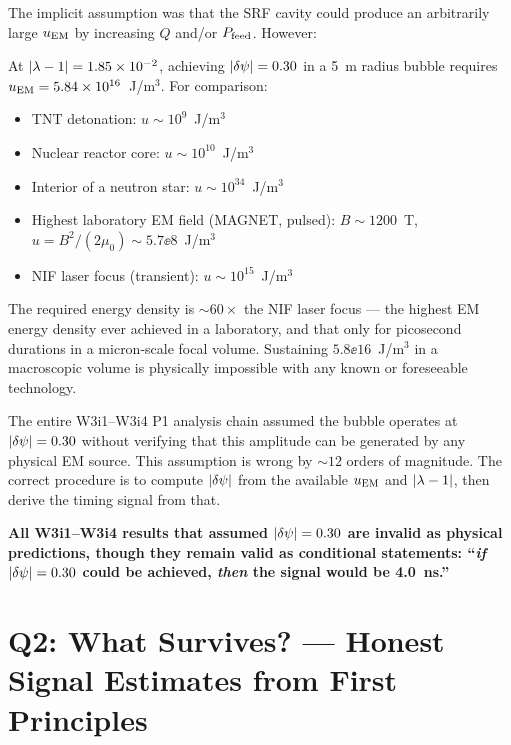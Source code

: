 The implicit assumption was that the SRF cavity could produce an arbitrarily
large $u_{\rm EM}$ by increasing $Q$ and/or $P_{\rm feed}$. However:

\begin{finding}[The $|\dpsi| = 0.30$ Operating Point Requires Nuclear-Scale
Energy Densities]
\label{find:nuclear}
At $|\lambda - 1| = 1.85\times 10^{-2}$, achieving $|\dpsi| = 0.30$ in a 5~m radius
bubble requires $u_{\rm EM} = 5.84\times 10^{16}$~J/m$^3$. For comparison:
\begin{itemize}[nosep]
\item TNT detonation: $u \sim 10^{9}$~J/m$^3$
\item Nuclear reactor core: $u \sim 10^{10}$~J/m$^3$
\item Interior of a neutron star: $u \sim 10^{34}$~J/m$^3$
\item Highest laboratory EM field (MAGNET, pulsed): $B \sim 1200$~T,
  $u = B^2/(2\mu_0) \sim 5.7\ee{8}$~J/m$^3$
\item NIF laser focus (transient): $u \sim 10^{15}$~J/m$^3$
\end{itemize}

The required energy density is $\sim 60\times$ the NIF laser focus ---
the highest EM energy density ever achieved in a laboratory, and that
only for picosecond durations in a micron-scale focal volume. Sustaining
$5.8\ee{16}$~J/m$^3$ in a macroscopic volume is physically impossible with
any known or foreseeable technology.
\end{finding}

\begin{correction}
\label{corr:unphysical_operating_point}
The entire W3i1--W3i4 P1 analysis chain assumed the bubble operates at
$|\dpsi| = 0.30$ without verifying that this amplitude can be generated by
any physical EM source. This assumption is wrong by $\sim 12$ orders of
magnitude. The correct procedure is to compute $|\delta\psi|$ from the available
$u_{\rm EM}$ and $|\lambda - 1|$, then derive the timing signal from that.

\textbf{All W3i1--W3i4 results that assumed $|\dpsi| = 0.30$ are invalid
as physical predictions, though they remain valid as conditional statements:
``\emph{if} $|\dpsi| = 0.30$ could be achieved, \emph{then} the signal would
be 4.0~ns.''}
\end{correction}

\section{Q2: What Survives? --- Honest Signal Estimates from First Principles}
\label{sec:honest_signal}

